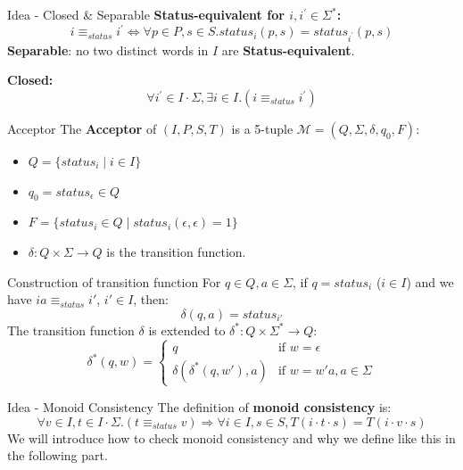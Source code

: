\documentclass{beamer}
\begin{document}
\begin{frame}{Idea - Closed \& Separable}
    \textbf{Status-equivalent for $i, i^{\prime}\in \Sigma^{*}$: }
    $$
        i \equiv_{status} i^{\prime} \Leftrightarrow  \forall p \in P,s \in S. status_i(p,s) = status_{i^{\prime}}(p,s)
    $$
    \textbf{Separable}: no two distinct words in $I$ are \textbf{Status-equivalent}. 
    
    \textbf{Closed: }
    $$
        \forall i^{\prime} \in I \cdot \Sigma,  \exists i \in I.(i \equiv_{status} i^{\prime}) 
    $$
\end{frame}

\begin{frame}{Acceptor}
    The \textbf{Acceptor} of $(I,P,S,T)$ is a 5-tuple $\mathcal{M} = (Q,\Sigma,\delta,q_0,F)$:
    \begin{itemize}
        \item $Q = \{status_i \mid i \in I\}$
        \item $q_0 = status_{\epsilon} \in Q$
        \item $F = \{status_i \in Q \mid status_i(\epsilon,\epsilon) = 1\}$
        \item $\delta \colon Q \times \Sigma \to Q$ is the transition function.
    \end{itemize}
    \begin{block}{Construction of transition function}
        For $q \in Q, a \in \Sigma$, if $q = status_i$ ($i \in I$) and we have $ia \equiv_{status} i'$, $i' \in I$, then:
        \[
            \delta(q,a) = status_{i'}
        \]
        The transition function $\delta$ is extended to $\delta^{*} \colon Q \times \Sigma^{*} \to Q$:
        \[
            \delta^{*}(q,w) = 
            \begin{cases}
                q & \text{if } w = \epsilon \\
                \delta(\delta^*(q,w'),a) & \text{if } w = w'a, a \in \Sigma
            \end{cases}
        \]
    \end{block}
\end{frame}

\begin{frame}{Idea - Monoid Consistency}
    The definition of \textbf{monoid consistency} is: 
    $$
		\forall v \in I, t\in I\cdot\Sigma. (t \equiv_{status} v) \Rightarrow \forall i\in I, s\in S, T(i\cdot t \cdot s) = T(i \cdot v \cdot s)
    $$
	We will introduce how to check monoid consistency and why we define like this in the following part.		

\end{frame}
\end{document}
